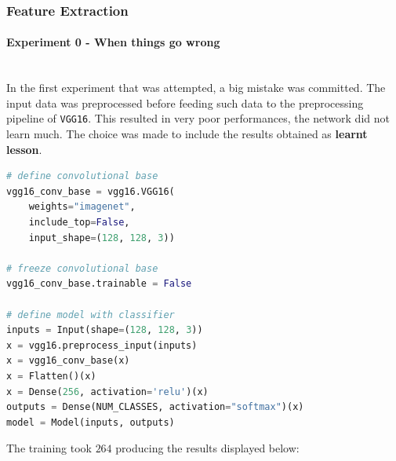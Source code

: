 \documentclass[11pt,a4paper]{article}
\begin{document}
\subsubsection{Feature Extraction}
\paragraph{Experiment 0 - When things go wrong}\mbox{}\\
In the first experiment that was attempted, a big mistake was committed. The input data was preprocessed before feeding such data to the preprocessing pipeline of \texttt{VGG16}. This resulted in very poor performances, the network did not learn much. The choice was made to include the results obtained as \textbf{learnt lesson}.
\begin{lstlisting}[language=Python,frame=single]
# define convolutional base
vgg16_conv_base = vgg16.VGG16(
    weights="imagenet",
    include_top=False,
    input_shape=(128, 128, 3))

# freeze convolutional base
vgg16_conv_base.trainable = False

# define model with classifier
inputs = Input(shape=(128, 128, 3))
x = vgg16.preprocess_input(inputs)
x = vgg16_conv_base(x)
x = Flatten()(x)
x = Dense(256, activation='relu')(x)
outputs = Dense(NUM_CLASSES, activation="softmax")(x)
model = Model(inputs, outputs)
\end{lstlisting}
The training took $264$ producing the results displayed below:
\end{document}
